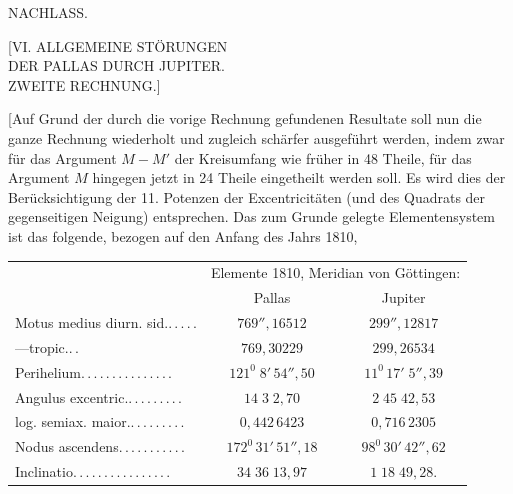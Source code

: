 \clearpage
\begin{landscape}
\begingroup
\fontsize{10}{13}\selectfont
{}
\renewcommand{\headrulewidth}{0pt}
\begin{center}
{\Large NACHLASS.}\par\bigskip
{\large [VI. ALLGEMEINE STÖRUNGEN\\DER PALLAS DURCH JUPITER.\\ZWEITE RECHNUNG.]}\par\bigskip
[1.]
\end{center}
\par\noindent\hspace*{\parindent}[Auf Grund der durch die vorige Rechnung gefundenen Resultate soll nun die ganze Rechnung wiederholt und zugleich schärfer ausgeführt werden, indem zwar für das Argument \(M-M'\) der Kreisumfang wie früher in 48 Theile, für das Argument \(M\) hingegen jetzt in 24 Theile eingetheilt werden soll. Es wird dies der Berücksichtigung der 11. Potenzen der Excentricitäten (und des Quadrats der gegenseitigen Neigung) entsprechen. Das zum Grunde gelegte Elementensystem ist das folgende, bezogen auf den Anfang des Jahrs 1810,
\begingroup
\small\setlength{\tabcolsep}{8pt}\renewcommand{\arraystretch}{1.2}
\begin{center}
\begin{tabular}{@{}lcc@{}}
&\multicolumn{2}{c}{Elemente 1810, Meridian von Göttingen:}\\
&Pallas&Jupiter\\
Motus medius diurn. sid.\enspace .\,.\,.\,.\,.&\(769''{,}16512\)&\(299''{,}12817\)\\
\hspace*{2em}---\hfill tropic.\enspace .\,.&\(769{,}30229\)&\(299{,}26534\)\\
Perihelium\enspace .\,.\,.\,.\,.\,.\,.\,.\,.\,.\,.\,.\,.\,.\,.&\(121^0\;8'\,54''{,}50\)&\(11^0\,17'\;5''{,}39\)\\
Angulus excentric.\enspace .\,.\,.\,.\,.\,.\,.\,.\,.&\(14\;3\;2{,}70\)&\(2\;45\;42{,}53\)\\
log. semiax. maior.\enspace .\,.\,.\,.\,.\,.\,.\,.\,.&\(0{,}442\,6423\)&\(0{,}716\,2305\)\\
Nodus ascendens\enspace .\,.\,.\,.\,.\,.\,.\,.\,.\,.\,.&\(172^0\,31'\,51''{,}18\)&\(98^0\,30'\,42''{,}62\)\\
Inclinatio\enspace .\,.\,.\,.\,.\,.\,.\,.\,.\,.\,.\,.\,.\,.\,.\,.&\(34\;36\;13{,}97\)&\(1\;18\;49{,}28.\)

\end{tabular}
\end{center}
\end{landscape}
